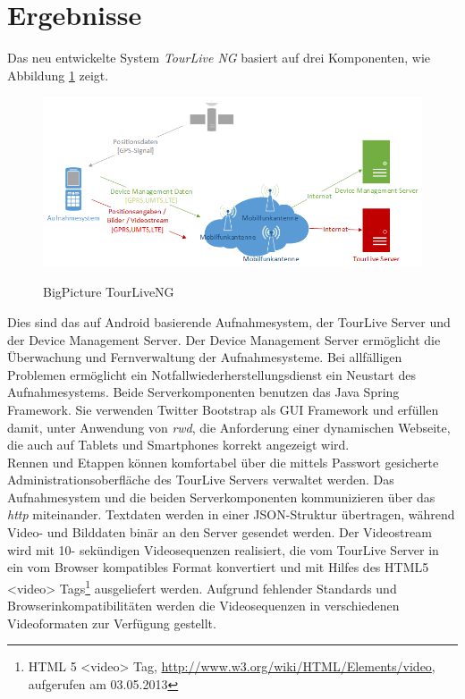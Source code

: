 \section*{Ergebnisse}
Das neu entwickelte System \textit{TourLive NG} basiert auf drei Komponenten, wie Abbildung \ref{fig:BigPictureAndroidClient} zeigt. 
\begin{figure}[H]
	\centering
	\includegraphics[width=140mm]{images/android/BigPicture_AndroidClient.png} 
	\label{fig:BigPictureAndroidClient}
	\caption{BigPicture TourLiveNG}
\end{figure}
Dies sind das auf Android basierende Aufnahmesystem, der TourLive Server und der Device Management Server. Der Device Management Server ermöglicht die Überwachung und Fernverwaltung der Aufnahmesysteme. Bei allfälligen Problemen ermöglicht ein Notfallwiederherstellungsdienst ein Neustart des Aufnahmesystems. Beide Serverkomponenten benutzen das  Java Spring Framework. Sie verwenden Twitter Bootstrap als GUI Framework und erfüllen damit, unter Anwendung von \textit{\gls{rwd}}, die Anforderung einer dynamischen Webseite, die auch auf Tablets und Smartphones korrekt angezeigt wird. 
\\

Rennen und Etappen können komfortabel über die mittels Passwort gesicherte Administrationsoberfläche des TourLive Servers verwaltet werden. Das Aufnahmesystem und die beiden Serverkomponenten kommunizieren über das \textit{\gls{http}} miteinander. Textdaten werden in einer JSON-Struktur übertragen, während Video- und Bilddaten binär an den Server gesendet  werden. Der Videostream wird mit 10- sekündigen Videosequenzen realisiert, die vom TourLive Server in ein vom Browser kompatibles Format konvertiert und mit Hilfes des HTML5 <video> Tags\footnote{HTML 5 <video> Tag,  \url{http://www.w3.org/wiki/HTML/Elements/video}, aufgerufen am 03.05.2013} ausgeliefert werden. Aufgrund fehlender Standards und Browserinkompatibilitäten werden die Videosequenzen in verschiedenen Videoformaten zur Verfügung gestellt.


